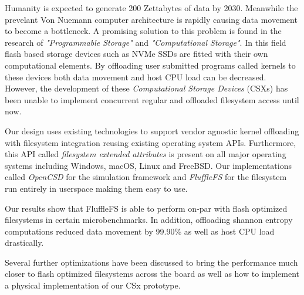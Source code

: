


\begin{abstracts}

Humanity is expected to generate 200 Zettabytes of data by 2030. Meanwhile the
prevelant Von Nuemann computer architecture is rapidly causing data movement
to become a bottleneck.  A promising solution to this problem is found in the
research of \textit{"Programmable Storage"} and
\textit{"Computational Storage"}. In this field flash based storage devices such
as NVMe SSDs are fitted with their own computational elements. By offloading
user submitted programs called kernels to these devices both data movement
and host CPU load can be decreased. However, the development of these
\textit{Computational Storage Devices} (CSXs) has been unable to implement
concurrent regular and offloaded filesystem access until now.

Our design uses existing technologies to support vendor agnostic kernel
offloading with filesystem integration reusing existing operating system
APIs. Furthermore, this API called \textit{filesystem extended attributes} is
present on all major operating systems including Windows, macOS, Linux and
FreeBSD. Our implementations called \textit{OpenCSD} for the simulation
framework and \textit{FluffleFS} for the filesystem run entirely in userspace
making them easy to use.

Our results show that FluffleFS is able to perform on-par with flash optimized
filesystems in certain microbenchmarks. In addition, offloading shannon
entropy computations reduced data movement by 99.90\% as well as host CPU load
drastically.

Several further optimizations have been discussed to bring the performance much
closer to flash optimized filesystems across the board as well as how to
implement a physical implementation of our CSx prototype.

\end{abstracts}


